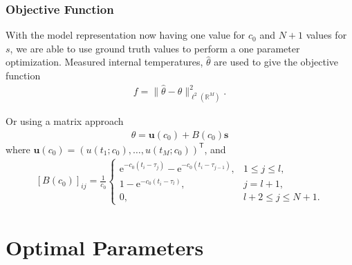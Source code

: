 \documentclass{beamer}
\begin{document}
\begin{frame}
  \frametitle{Objective Function}
With the model representation now having one value for $c_0$ and
$N+1$ values for $s$, we are able to use ground truth values to
perform a one parameter optimization. Measured internal temperatures, $\hat{\theta}$ are used to
give the objective function 
\begin{align}
\label{eq:min-f}
    f = \|\hat{\theta} - \theta\|^2_{\ell^2(\mathbb{R}^M)}.
\end{align}
\end{frame}

\begin{frame}

Or using a matrix approach 
\begin{align}
\label{eq:thetavec}
    \theta = \mathbf{u}(c_0) + B(c_0) \mathbf{s}
\end{align}
 where $\mathbf{u}(c_0) = (u(t_1;c_0),\ldots,u(t_M;c_0))^{\textsf{T}}$, and
 \begin{align}
 \label{bdefn}
     [B(c_0)]_{ij} = \frac{1}{c_0}\begin{cases}
     \textrm{e}^{-c_0(t_i-\tau_j)}-\textrm{e}^{-c_0(t_i-\tau_{j-1})}, &
     1 \le j \le l,\\
     1-\textrm{e}^{-c_0(t_i-\tau_l)}, & j = l+1,\\
     0, & l+2 \le j \le N+1.
     \end{cases}
 \end{align} 
\end{frame}

\section{Optimal Parameters}
\end{document}
